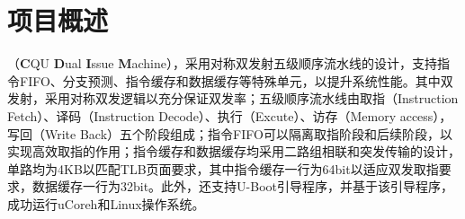 \section{项目概述}
\cpuname（\textbf{C}QU \textbf{D}ual \textbf{I}ssue \textbf{M}achine），采用对称双发射五级顺序流水线的设计，支持指令FIFO、分支预测、指令缓存和数据缓存等特殊单元，以提升系统性能。其中双发射，采用对称双发逻辑以充分保证双发率；五级顺序流水线由取指（Instruction Fetch）、译码（Instruction Decode）、执行（Excute）、访存（Memory access），写回（Write Back）五个阶段组成；指令FIFO可以隔离取指阶段和后续阶段，以实现高效取指的作用；指令缓存和数据缓存均采用二路组相联和突发传输的设计，单路均为4KB以匹配TLB页面要求，其中指令缓存一行为64bit以适应双发取指要求，数据缓存一行为32bit。\todo 此外，\cpuname 还支持U-Boot引导程序，并基于该引导程序，成功运行uCoreh和Linux操作系统。
